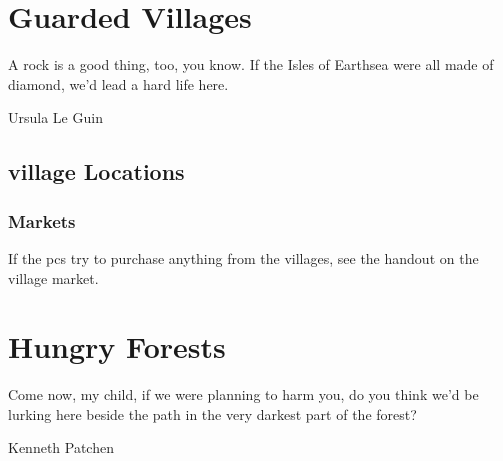 \documentclass[a4paper,openany]{book}
\begin{document}
\stopcontents[Town]

\stopcontents[sq]

\chapter{Guarded Villages}
\epigraph{A rock is a good thing, too, you know. If the Isles of Earthsea were all made of diamond, we'd lead a hard life here.}{Ursula Le Guin}

\section{\Gls{village} Locations}

\begin{multicols}{2}

\subsection{Markets}

If the \glspl{pc} try to purchase anything from the \glspl{village}, see the handout on the village market.

%
%
%



\end{multicols}





%

%

%

%



\chapter{Hungry Forests}
\epigraph{Come now, my child, if we were planning to harm you, do you think we'd be lurking here beside the path in the very darkest part of the forest?}{Kenneth Patchen}
\end{document}
